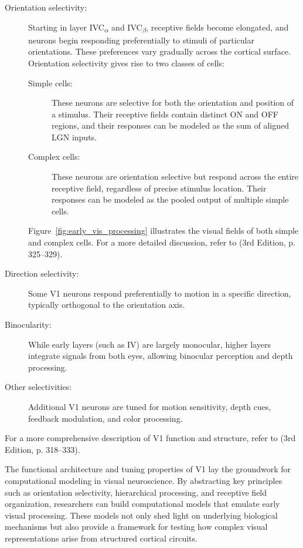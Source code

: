 \begin{description}
    \item[Orientation selectivity:] Starting in layer IVC\textsubscript{\ensuremath{\alpha}} and IVC\textsubscript{\ensuremath{\beta}}, receptive fields become elongated, and neurons begin responding preferentially to stimuli of particular orientations. These preferences vary gradually across the cortical surface. Orientation selectivity gives rise to two classes of cells:
    \begin{description}
        \item[Simple cells:] These neurons are selective for both the orientation and position of a stimulus. Their receptive fields contain distinct ON and OFF regions, and their responses can be modeled as the sum of aligned LGN inputs.
        \item[Complex cells:] These neurons are orientation selective but respond across the entire receptive field, regardless of precise stimulus location. Their responses can be modeled as the pooled output of multiple simple cells.
    \end{description}
    Figure~\ref{fig:early_vis_processing} illustrates the visual fields of both simple and complex cells. For a more detailed discussion, refer to \citet{bear2020neuroscience} (3rd Edition, p. 325--329).

    \item[Direction selectivity:] Some V1 neurons respond preferentially to motion in a specific direction, typically orthogonal to the orientation axis.

    \item[Binocularity:] While early layers (such as IV) are largely monocular, higher layers integrate signals from both eyes, allowing binocular perception and depth processing.

    \item[Other selectivities:] Additional V1 neurons are tuned for motion sensitivity, depth cues, feedback modulation, and color processing.
\end{description}

For a more comprehensive description of V1 function and structure, refer to \citet{bear2020neuroscience} (3rd Edition, p. 318--333).

The functional architecture and tuning properties of V1 lay the groundwork for computational modeling in visual neuroscience. By abstracting key principles such as orientation selectivity, hierarchical processing, and receptive field organization, researchers can build computational models that emulate early visual processing. These models not only shed light on underlying biological mechanisms but also provide a framework for testing how complex visual representations arise from structured cortical circuits.

